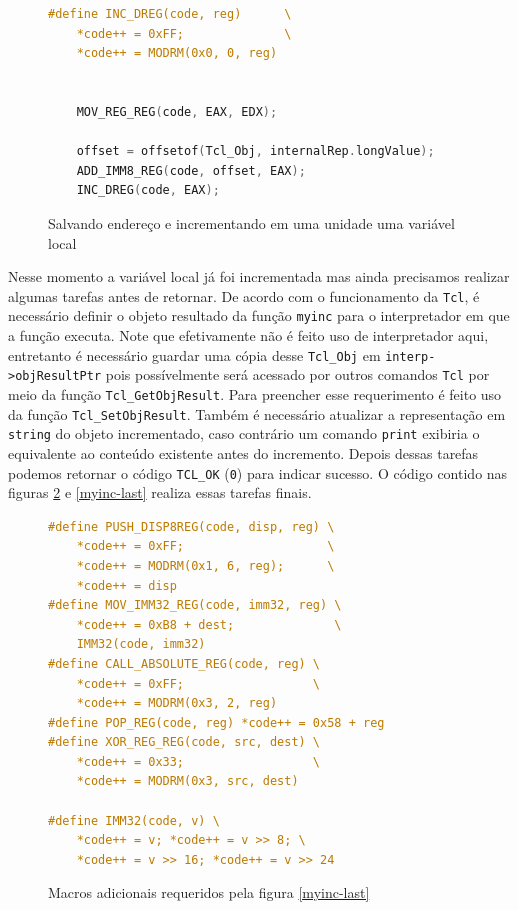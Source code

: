 \begin{figure}[h]
  \centering
  \begin{lstlisting}[language=C]
#define INC_DREG(code, reg)      \
    *code++ = 0xFF;              \
    *code++ = MODRM(0x0, 0, reg)


    MOV_REG_REG(code, EAX, EDX);

    offset = offsetof(Tcl_Obj, internalRep.longValue);
    ADD_IMM8_REG(code, offset, EAX);
    INC_DREG(code, EAX);
  \end{lstlisting}
  \caption{Salvando endereço e incrementando em uma unidade uma variável local\label{inc-tclobj}}
\end{figure}

Nesse momento a variável local já foi incrementada mas ainda
precisamos realizar algumas tarefas antes de retornar. De acordo com o
funcionamento da \texttt{Tcl}, é
necessário definir o objeto resultado da função \verb!myinc! para o
interpretador em que a função executa. Note que efetivamente não é feito
uso de interpretador aqui, entretanto é necessário guardar uma cópia desse
\verb!Tcl_Obj! em \verb!interp->objResultPtr! pois possívelmente será acessado
por outros comandos \texttt{Tcl} por meio da função \verb!Tcl_GetObjResult!.
Para preencher esse requerimento é feito uso da função \verb!Tcl_SetObjResult!.
Também é necessário atualizar a representação em
\verb!string! do objeto incrementado, caso contrário um comando
\verb!print! exibiria o equivalente ao conteúdo existente antes do incremento.
Depois dessas tarefas podemos
retornar o código \verb!TCL_OK! (\verb!0!) para indicar sucesso.
O código contido nas figuras \ref{myinc-last-macros} e \ref{myinc-last}
realiza essas tarefas finais.

\begin{figure}[ht!]
  \centering
  \begin{lstlisting}[language=C]
#define PUSH_DISP8REG(code, disp, reg) \
    *code++ = 0xFF;                    \
    *code++ = MODRM(0x1, 6, reg);      \
    *code++ = disp
#define MOV_IMM32_REG(code, imm32, reg) \
    *code++ = 0xB8 + dest;              \
    IMM32(code, imm32)
#define CALL_ABSOLUTE_REG(code, reg) \
    *code++ = 0xFF;                  \
    *code++ = MODRM(0x3, 2, reg)
#define POP_REG(code, reg) *code++ = 0x58 + reg
#define XOR_REG_REG(code, src, dest) \
    *code++ = 0x33;                  \
    *code++ = MODRM(0x3, src, dest)

#define IMM32(code, v) \
    *code++ = v; *code++ = v >> 8; \
    *code++ = v >> 16; *code++ = v >> 24
  \end{lstlisting}
  \caption{Macros adicionais requeridos pela figura \ref{myinc-last}\label{myinc-last-macros}}
\end{figure}

